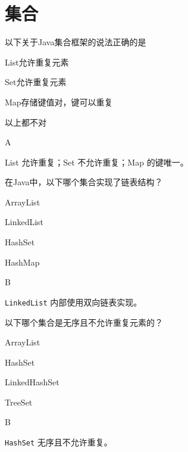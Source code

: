 \section{集合}

\begin{question}
	以下关于Java集合框架的说法正确的是
	\begin{options}
		\item List允许重复元素
		\item Set允许重复元素
		\item Map存储键值对，键可以重复
		\item 以上都不对
	\end{options}
	\begin{answer}
		A
	\end{answer}
	\begin{explanation}
		List 允许重复；Set 不允许重复；Map 的键唯一。
	\end{explanation}
\end{question}

\begin{question}
	在Java中，以下哪个集合实现了链表结构？
	\begin{options}
		\item ArrayList
		\item LinkedList
		\item HashSet
		\item HashMap
	\end{options}
	\begin{answer}
		B
	\end{answer}
	\begin{explanation}
		\texttt{LinkedList} 内部使用双向链表实现。
	\end{explanation}
\end{question}

\begin{question}
	以下哪个集合是无序且不允许重复元素的？
	\begin{options}
		\item ArrayList
		\item HashSet
		\item LinkedHashSet
		\item TreeSet
	\end{options}
	\begin{answer}
		B
	\end{answer}
	\begin{explanation}
		\texttt{HashSet} 无序且不允许重复。
	\end{explanation}
\end{question}

